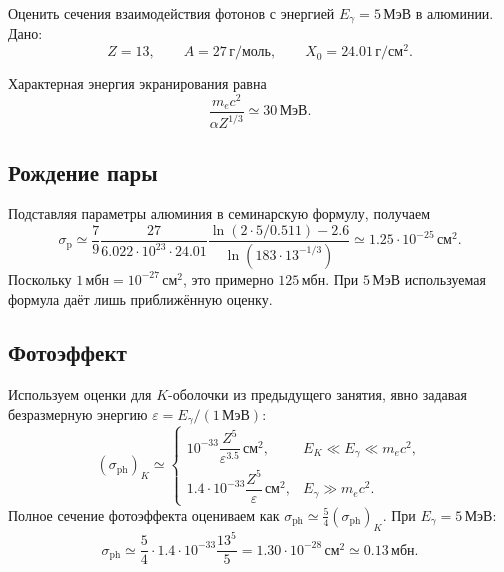 \documentclass[../final.tex]{subfiles}
\begin{document}
\label{task:al_photons_sem4}

\condition
Оценить сечения взаимодействия фотонов с энергией $E_\gamma=5\,\text{МэВ}$
в алюминии. Дано:
\begin{equation*}
    Z=13,\qquad A=27\,\text{г}/\text{моль},\qquad
    X_0=24.01\,\text{г}/\text{см}^2.
\end{equation*}

\solution
Характерная энергия экранирования равна
\begin{equation*}
    \frac{m_ec^2}{\alpha Z^{1/3}}\simeq30\,\text{МэВ}.
\end{equation*}

\subsection*{Рождение пары}

Подставляя параметры алюминия в семинарскую формулу, получаем
\begin{equation*}
    \sigma_{\mathrm p}\simeq
    \frac79\frac{27}{6.022\cdot10^{23}\cdot24.01}
    \frac{\ln(2\cdot5/0.511)-2.6}{\ln(183\cdot13^{-1/3})}
    \simeq1.25\cdot10^{-25}\,\text{см}^2.
\end{equation*}
Поскольку $1\,\text{мбн}=10^{-27}\,\text{см}^2$, это примерно
$125\,\text{мбн}$. При $5\,\text{МэВ}$ используемая формула даёт
лишь приближённую оценку.

\subsection*{Фотоэффект}

Используем оценки для $K$-оболочки из предыдущего занятия, явно задавая
безразмерную энергию $\varepsilon=E_\gamma/(1\,\text{МэВ})$:
\begin{equation*}
    (\sigma_{\mathrm{ph}})_K\simeq
    \begin{cases}
        10^{-33}\dfrac{Z^5}{\varepsilon^{3.5}}\,\text{см}^2,
        & E_K\ll E_\gamma\ll m_ec^2,\\[0.7em]
        1.4\cdot10^{-33}\dfrac{Z^5}{\varepsilon}\,\text{см}^2,
        & E_\gamma\gg m_ec^2.
    \end{cases}
\end{equation*}
Полное сечение фотоэффекта оцениваем как $\sigma_{\mathrm{ph}}\simeq
\tfrac54(\sigma_{\mathrm{ph}})_K$. При $E_\gamma=5\,\text{МэВ}$:
\begin{equation*}
    \sigma_{\mathrm{ph}}\simeq
    \frac54\cdot1.4\cdot10^{-33}\frac{13^5}{5}
    =1.30\cdot10^{-28}\,\text{см}^2
    \simeq0.13\,\text{мбн}.
\end{equation*}
\end{document}

